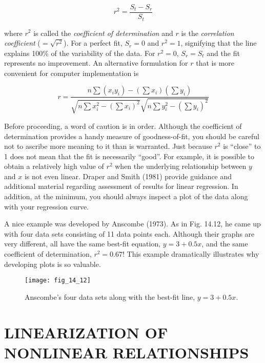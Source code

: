 \documentclass[../main.tex]{subfiles}
\begin{document}
\begin{equation}
	\tag{14.20}
	r^2 = \frac{S_t - S_r}{S_t}
\end{equation}

\noindent where $r^2$ is called the \textit{coefficient of determination} and $r$ is the \textit{correlation coefficient} ($=\sqrt{r^2}$). For a perfect fit, $S_r = 0$ and $r^2 = 1$, signifying that the line explains 100\% of the variability of the data. For $r^2 = 0$, $S_r = S_t$ and the fit represents no improvement. An alternative formulation for $r$ that is more convenient for computer implementation is

\begin{equation}
	\tag{14.21}
	r = \frac{n \sum (x_i y_i) - (\sum x_i) (\sum y_i)}{\sqrt{n \sum x^2_i - (\sum x_i)^2} \sqrt{n \sum y^2_i - (\sum y_i)^2}}
\end{equation}


Before proceeding, a word of caution is in order. Although the coefficient of determination provides a handy measure of goodness-of-fit, you should be careful not to ascribe more meaning to it than is warranted. Just because $r^2$ is ``close'' to 1 does not mean that the fit is necessarily ``good''. For example, it is possible to obtain a relatively high value of $r^2$ when the underlying relationship between $y$ and $x$ is not even linear. Draper and Smith (1981) provide guidance and additional material regarding assessment of results for linear regression. In addition, at the minimum, you should always inspect a plot of the data along with your regression curve.

A nice example was developed by Anscombe (1973). As in Fig. 14.12, he came up with four data sets consisting of 11 data points each. Although their graphs are very different, all have the same best-fit equation, $y = 3 + 0.5 x$, and the same coefficient of determination, $r^2 = 0.67$! This example dramatically illustrates why developing plots is so valuable.

\begin{figure}[H]
	\centering
	\texttt{[image: fig\_14\_12]}
	\caption{\textsf{Anscombe’s four data sets along with the best-fit line, $y = 3 + 0.5x$.}}
	\label{fig:fig_14_12}
\end{figure}


\label{cha:cha_P_14_4}
\section{LINEARIZATION OF NONLINEAR RELATIONSHIPS}
\end{document}
